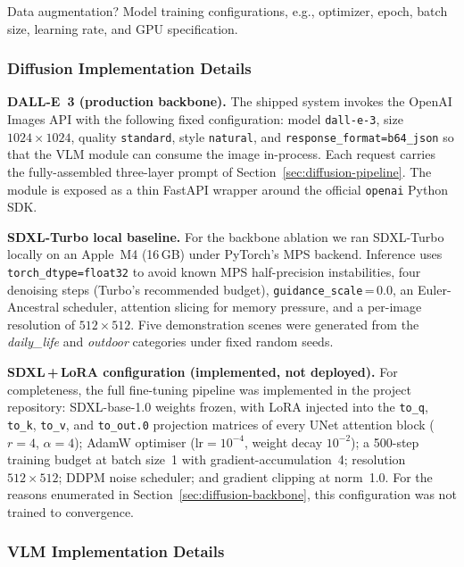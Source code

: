 \documentclass{article}
\begin{document}
Data augmentation? Model training configurations, e.g., optimizer, epoch, batch size, learning rate, and GPU specification.

\subsubsection{Diffusion Implementation Details}
\label{sec:diffusion-impl}

\noindent\textbf{DALL-E~3 (production backbone).}
The shipped system invokes the OpenAI Images API with the following
fixed configuration: model \texttt{dall-e-3}, size
$1024\!\times\!1024$, quality \texttt{standard}, style \texttt{natural},
and \texttt{response\_format=b64\_json} so that the VLM module can
consume the image in-process. Each request carries the fully-assembled
three-layer prompt of Section~\ref{sec:diffusion-pipeline}. The module
is exposed as a thin FastAPI wrapper around the official
\texttt{openai} Python SDK.

\noindent\textbf{SDXL-Turbo local baseline.}
For the backbone ablation we ran SDXL-Turbo locally on an Apple~M4
(16\,GB) under PyTorch's MPS backend. Inference uses
\texttt{torch\_dtype=float32} to avoid known MPS half-precision
instabilities, four denoising steps (Turbo's recommended budget),
\texttt{guidance\_scale}\,=\,0.0, an Euler-Ancestral scheduler,
attention slicing for memory pressure, and a per-image resolution of
$512\!\times\!512$. Five demonstration scenes were generated from the
\textit{daily\_life} and \textit{outdoor} categories under fixed
random seeds.

\noindent\textbf{SDXL\,+\,LoRA configuration (implemented, not
deployed).}
For completeness, the full fine-tuning pipeline was implemented in the
project repository: SDXL-base-1.0 weights frozen, with LoRA injected
into the \texttt{to\_q}, \texttt{to\_k}, \texttt{to\_v}, and
\texttt{to\_out.0} projection matrices of every UNet attention block
($r\!=\!4$, $\alpha\!=\!4$); AdamW optimiser
($\text{lr}\!=\!10^{-4}$, weight decay $10^{-2}$); a 500-step training
budget at batch size~1 with gradient-accumulation~4; resolution
$512\!\times\!512$; DDPM noise scheduler; and gradient clipping at
norm~1.0. For the reasons enumerated in
Section~\ref{sec:diffusion-backbone}, this configuration was not
trained to convergence.

\subsubsection{VLM Implementation Details}
\label{sec:vlm-impl}
\end{document}

